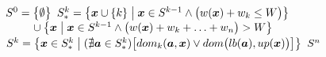 \begin{algorithmic}[1]
    \State $S^0 = \big\{\emptyset\big\}$
      \State $S_*^k = \big\{\boldsymbol{x} \cup \{k\} \;\big|\; \boldsymbol{x}
        \in S^{k-1} \land \big(w(\boldsymbol{x}) + w_k \leq W\big) \big\}$
      \State $\phantom{\solSett^k = } \cup \big\{ \sol{x} \;\big|\; \sol{x} \in \solSet^{k-1} \logicAnd
        \big(\weight{x} + w_{k} + \ldots + w_n\big) > W \big\}$
      \State $S^k = \big\{\boldsymbol{x} \in S_*^k \;\big|\;
        (\nexists \boldsymbol{a} \in S_*^k)\big[dom_k(\boldsymbol{a}, \boldsymbol{x})
          \lor dom\big(lb(\boldsymbol{a}), up(\boldsymbol{x})\big)\big] \big\}$
    \EndFor
    \State \Return $S^n$
  \EndFunction
\end{algorithmic}

